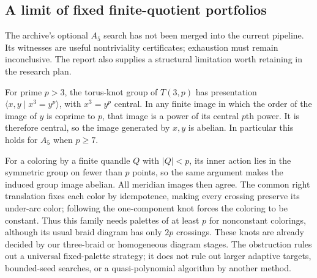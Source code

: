 \subsection{A limit of fixed finite-quotient portfolios}
The archive's optional $A_5$ search has not been merged into the
current pipeline. Its witnesses are useful nontriviality certificates;
exhaustion must remain inconclusive. The report also supplies a
structural limitation worth retaining in the research plan.

For prime $p>3$, the torus-knot group of $T(3,p)$ has presentation
$\langle x,y\mid x^3=y^p\rangle$, with $x^3=y^p$ central.
In any finite image in which the order of the image of $y$ is
coprime to $p$, that image is a power of its central $p$th power.
It is therefore central, so the image generated by $x,y$ is abelian.
In particular this holds for $A_5$ when $p\ge7$.

For a coloring by a finite quandle $Q$ with $|Q|<p$, its inner action
lies in the symmetric group on fewer than $p$ points, so the same
argument makes the induced group image abelian. All meridian images
then agree. The common right translation fixes each color by
idempotence, making every crossing preserve its under-arc color;
following the one-component knot forces the coloring to be constant.
Thus this family needs palettes of at least $p$ for nonconstant
colorings, although its usual braid diagram has only $2p$ crossings.
These knots are already decided by our three-braid or homogeneous
diagram stages. The obstruction rules out a universal fixed-palette
strategy; it does not rule out larger adaptive targets, bounded-seed
searches, or a quasi-polynomial algorithm by another method.
